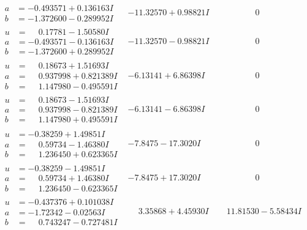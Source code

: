 \documentclass[1p]{elsarticle_modified}
\theoremstyle{definition}
\begin{document}
$$\begin{array}{c|c|c}
\begin{aligned}
a &= -0.493571 + 0.136163 I \\
b &= -1.372600 - 0.289952 I\end{aligned}
 & -11.32570 + 0.98821 I & \phantom{-0.000000 } 0 \\ \hline\begin{aligned}
u &= \phantom{-}0.17781 - 1.50580 I \\
a &= -0.493571 - 0.136163 I \\
b &= -1.372600 + 0.289952 I\end{aligned}
 & -11.32570 - 0.98821 I & \phantom{-0.000000 } 0 \\ \hline\begin{aligned}
u &= \phantom{-}0.18673 + 1.51693 I \\
a &= \phantom{-}0.937998 + 0.821389 I \\
b &= \phantom{-}1.147980 - 0.495591 I\end{aligned}
 & -6.13141 + 6.86398 I & \phantom{-0.000000 } 0 \\ \hline\begin{aligned}
u &= \phantom{-}0.18673 - 1.51693 I \\
a &= \phantom{-}0.937998 - 0.821389 I \\
b &= \phantom{-}1.147980 + 0.495591 I\end{aligned}
 & -6.13141 - 6.86398 I & \phantom{-0.000000 } 0 \\ \hline\begin{aligned}
u &= -0.38259 + 1.49851 I \\
a &= \phantom{-}0.59734 - 1.46380 I \\
b &= \phantom{-}1.236450 + 0.623365 I\end{aligned}
 & -7.8475 - 17.3020 I & \phantom{-0.000000 } 0 \\ \hline\begin{aligned}
u &= -0.38259 - 1.49851 I \\
a &= \phantom{-}0.59734 + 1.46380 I \\
b &= \phantom{-}1.236450 - 0.623365 I\end{aligned}
 & -7.8475 + 17.3020 I & \phantom{-0.000000 } 0 \\ \hline\begin{aligned}
u &= -0.437376 + 0.101038 I \\
a &= -1.72342 - 0.02563 I \\
b &= \phantom{-}0.743247 - 0.727481 I\end{aligned}
 & \phantom{-}3.35868 + 4.45930 I & \phantom{-}11.81530 - 5.58434 I \\ \hline\begin{aligned}

\end{aligned}
\end{array}$$
\end{document}
